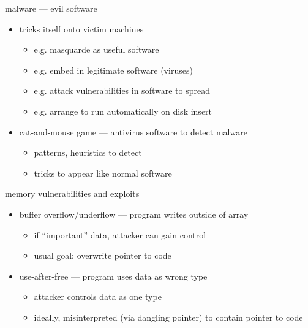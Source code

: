 \begin{frame}{malware --- evil software}
    \begin{itemize}
        \item tricks itself onto victim machines
            \begin{itemize}
            \item e.g. masquarde as useful software
            \item e.g. embed in legitimate software (viruses)
            \item e.g. attack vulnerabilities in software to spread
            \item e.g. arrange to run automatically on disk insert
            \end{itemize}
        \item cat-and-mouse game --- antivirus software to detect malware
            \begin{itemize}
            \item patterns, heuristics to detect
            \item tricks to appear like normal software
            \end{itemize}
    \end{itemize}
\end{frame}

\begin{frame}{memory vulnerabilities and exploits}
    \begin{itemize}
        \item buffer overflow/underflow --- program writes outside of array
            \begin{itemize}
            \item if ``important'' data, attacker can gain control
            \item usual goal: overwrite pointer to code
            \end{itemize}
        \item use-after-free --- program uses data as wrong type
            \begin{itemize}
                \item attacker controls data as one type
                \item ideally, misinterpreted (via dangling pointer) to contain pointer to code
            \end{itemize}
    \end{itemize}
\end{frame}

